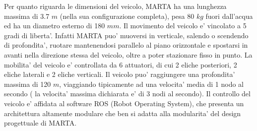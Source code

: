 Per quanto riguarda le dimensioni del veicolo, MARTA ha una lunghezza massima di 3.7 $m$ (nella sua configurazione completa), pesa 80 $kg$ fuori dall'acqua ed  ha un diametro esterno di 180 $mm$. Il movimento del veicolo e' vincolato a 5 gradi di liberta'. Infatti MARTA puo' muoversi in verticale, salendo o scendendo di profondita', ruotare mantenendosi parallelo al piano orizzontale e spostarsi in avanti nella direzione stessa del veicolo, oltre a poter stazionare fisso in punto. La mobilita' del veicolo e' controllata da 6 attuatori, di cui 2 eliche posteriori, 2 eliche laterali e 2 eliche verticali. Il veicolo puo' raggiungere una profondita' massima di 120 $m$, viaggiando tipicamente ad una velocita' media di 1 nodo al secondo ( la velocita' massima dichiarata e' di 3 nodi al secondo). \newline 
Il controllo del veicolo e' affidata al software ROS (Robot Operating System), che presenta un architettura altamente modulare che ben si adatta alla modularita' del design progettuale di MARTA.


